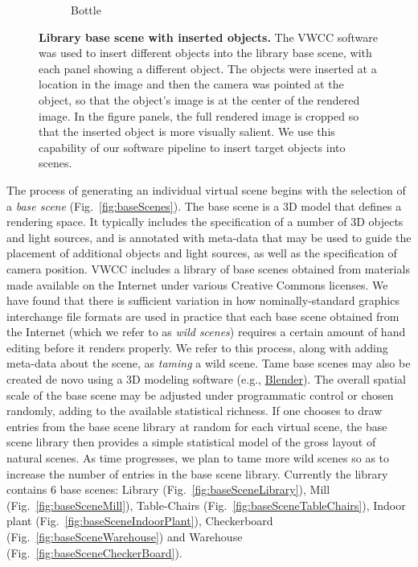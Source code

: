 \documentclass{jov}
\begin{document}
\begin{figure}
\begin{subfigure}[b]{0.14 \textwidth}
        \caption{Bottle}
        \label{fig:libraryWithChampagneBottle}
    \end{subfigure}
\caption{{\bf Library base scene with inserted objects.} The VWCC software was used to insert different objects into the library base scene, with each panel showing a different object. The objects were inserted at a location in the image and then the camera was pointed at the object, so that the object's image is at the center of the rendered image.  In the figure panels, the full rendered image is cropped so that the inserted object is more visually salient. We use this capability of our software pipeline to insert target objects into scenes.}\label{fig:libraryWithTarget}
\end{figure}


The process of generating an individual virtual scene begins with the selection of a \textit{base scene} (Fig.~\ref{fig:baseScenes}). The base scene is a 3D model that defines a rendering space.  It typically includes the specification of a number of 3D objects and light sources, and is annotated with meta-data that may be used to guide the placement of additional objects and light sources, as well as the specification of camera position. VWCC includes a library of base scenes obtained from materials made available on the Internet under various Creative Commons licenses. We have found that there is sufficient variation in how nominally-standard graphics interchange file formats are used in practice that each base scene obtained from the Internet (which we refer to as \textit{wild scenes}) requires a certain amount of hand editing before it renders properly. We refer to this process, along with adding meta-data about the scene, as \textit{taming} a wild scene. Tame base scenes may also be created de novo using a 3D modeling software (e.g., \href{https://www.blender.org/}{Blender}).  The overall spatial scale of the base scene may be adjusted under programmatic control or chosen randomly, adding to the available statistical richness. If one chooses to draw entries from the base scene library at random for each virtual scene, the base scene library then provides a simple statistical model of the gross layout of natural scenes. As time progresses, we plan to tame more wild scenes so as to increase the number of entries in the base scene library. Currently the library contains 6 base scenes: Library (Fig.~\ref{fig:baseSceneLibrary}), Mill (Fig.~\ref{fig:baseSceneMill}), Table-Chairs (Fig.~\ref{fig:baseSceneTableChairs}), Indoor plant (Fig.~\ref{fig:baseSceneIndoorPlant}), Checkerboard (Fig.~\ref{fig:baseSceneWarehouse}) and Warehouse (Fig.~\ref{fig:baseSceneCheckerBoard}).
\end{document}
